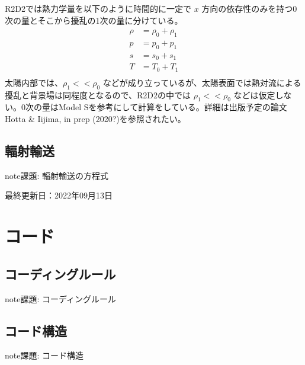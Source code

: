\documentclass[letterpaper,10pt,dvipdfmx,report]{sphinxmanual}
\begin{document}
\sphinxAtStartPar
R2D2では熱力学量を以下のように時間的に一定で \(x\) 方向の依存性のみを持つ0次の量とそこから擾乱の1次の量に分けている。
\begin{equation*}
\begin{split}\rho &= \rho_0 + \rho_1 \\
p &= p_0 + p_1 \\
s &= s_0 + s_1 \\
T &= T_0 + T_1 \\\end{split}
\end{equation*}
\sphinxAtStartPar
太陽内部では、\(\rho_1 << \rho_0\) などが成り立っているが、太陽表面では熱対流による擾乱と背景場は同程度となるので、R2D2の中では \(\rho_1 << \rho_0\) などは仮定しない。0次の量はModel Sを参考にして計算をしている。詳細は出版予定の論文Hotta \& Iijima, in prep (2020?)を参照されたい。


\section{輻射輸送}
\label{\detokenize{equation:id3}}
\begin{sphinxadmonition}{note}{\label{\detokenize{equation:id4}}課題:}
\sphinxAtStartPar
輻射輸送の方程式
\end{sphinxadmonition}

\sphinxAtStartPar
最終更新日：2022年09月13日

\sphinxstepscope


\chapter{コード}
\label{\detokenize{code:id1}}\label{\detokenize{code::doc}}

\section{コーディングルール}
\label{\detokenize{code:id2}}
\begin{sphinxadmonition}{note}{\label{\detokenize{code:id3}}課題:}
\sphinxAtStartPar
コーディングルール
\end{sphinxadmonition}


\section{コード構造}
\label{\detokenize{code:id4}}
\begin{sphinxadmonition}{note}{\label{\detokenize{code:id5}}課題:}
\sphinxAtStartPar
コード構造
\end{sphinxadmonition}
\end{document}
